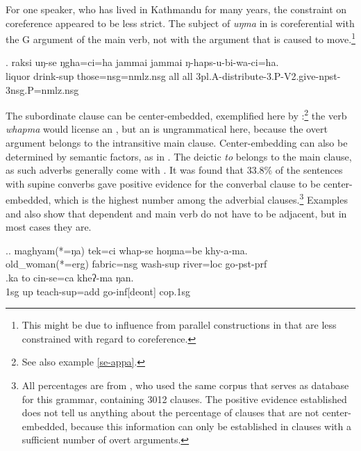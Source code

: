 For one speaker, who has lived  in Kathmandu for many years, the constraint on coreference appeared to be less strict. The subject of \emph{uŋma}  in \Next is coreferential with the G argument of the main verb, not with the argument that is caused to move.\footnote{This might be due to influence from parallel constructions in  that are less constrained with regard to coreference.}

		\exg.		raksi  uŋ-se          ŋgha=ci=ha            jammai jammai ŋ-haps-u-bi-wa-ci=ha.\\
	liquor   drink{\sc -sup} those{\sc =nsg=nmlz.nsg} all all {\sc 3pl.A-}distribute{\sc -3.P-V2.give-npst-3nsg.P=nmlz.nsg}\\
	
\newpage	
The subordinate clause can be center-embedded, exemplified here by \Next[a]:\footnote{See also example \ref{se-appa}.} the verb \emph{whapma} would license an , but an  is ungrammatical here, because the overt argument belongs to the intransitive main clause. Center-embedding can also be determined by semantic factors, as in \Next[b]. The deictic  \emph{to} belongs to the main clause, as such adverbs generally come with . It was found that 33.8\% of the sentences with supine converbs gave positive evidence for the converbal clause to be center-embedded, which is the highest number among the adverbial clauses.\footnote{All percentages are from \citep{Bierkandtetal_Scope}, who used the same corpus that serves as database for this grammar, containing 3012 clauses. The positive evidence established does not tell us anything about the percentage of clauses that are not center-embedded, because this information can only be established in clauses with a sufficient number of overt arguments.} Examples  \Last and  \Next also show that dependent and main verb do not have to be adjacent, but in most cases they are.
 		
\ex.\ag. maghyam(*=ŋa)   tek=ci        whap-se                hoŋma=be    khy-a-ma.\\
old\_woman(*=erg) fabric{\sc =nsg} wash{\sc -sup} river{\sc =loc} go{\sc [3sg]-pst-prf}\\
\bg.ka  to  cin-se=ca    kheʔ-ma   ŋan.\\
{\sc 1sg} up teach{\sc -sup=add} go{\sc -inf[deont]} {\sc cop.1sg}\\
		
